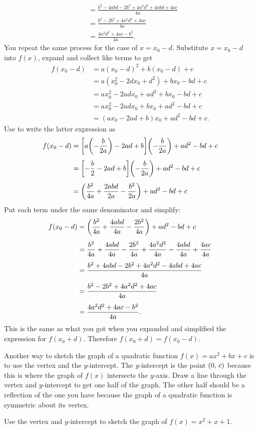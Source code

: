 \documentclass[a4paper,oneside,12pt]{article}
\begin{document}
\begin{problem}
{\begin{solution}
\begin{align*}
&=
\frac{
  b^2 - 4abd - 2b^2 + 4a^2d^2 + 4abd + 4ac
}{
  4a
} \\[4pt]
&=
\frac{
  b^2 - 2b^2 + 4a^2d^2 + 4ac
}{
  4a
} \\[4pt]
&=
\frac{
  4a^2d^2 + 4ac - b^2
}{
  4a
}.
\end{align*}
You repeat the same process for the case of $x = x_0 - d$.  Substitute
$x = x_0 - d$ into $f(x)$, expand and collect like terms to get
\begin{align*}
f(x_0 - d)
&=
a(x_0 - d)^2 + b(x_0 - d) + c \\[4pt]
&=
a(x_0^2 - 2dx_0 + d^2) + bx_0 - bd + c \\[4pt]
&=
ax_0^2 - 2adx_0 + ad^2 + bx_0 - bd + c \\[4pt]
&=
ax_0^2 - 2adx_0 + bx_0 + ad^2 - bd + c \\[4pt]
&=
(ax_0 - 2ad + b)x_0 + ad^2 - bd + c.
\end{align*}
Use  to write the
latter expression as
\begin{align*}
f(x_0 - d)
&=
\squarebracket*{
  a\parenthesis*{-\frac{b}{2a}} - 2ad + b
}
\parenthesis*{-\frac{b}{2a}} + ad^2 - bd + c \\[4pt]
&=
\squarebracket*{
  -\frac{b}{2} - 2ad + b
}
\parenthesis*{-\frac{b}{2a}} + ad^2 - bd + c \\[4pt]
&=
\parenthesis*{
  \frac{b^2}{4a} + \frac{2abd}{2a} - \frac{b^2}{2a}
}
+ ad^2 - bd + c
\end{align*}
Put each term under the same denominator and simplify:
\begin{align*}
f(x_0 - d)
&=
\parenthesis*{
  \frac{b^2}{4a} + \frac{4abd}{4a} - \frac{2b^2}{4a}
}
+ ad^2 - bd + c \\[4pt]
&=
\frac{b^2}{4a} + \frac{4abd}{4a} - \frac{2b^2}{4a}
+ \frac{4a^2d^2}{4a} - \frac{4abd}{4a} + \frac{4ac}{4a} \\[4pt]
&=
\frac{
  b^2 + 4abd - 2b^2 + 4a^2d^2 - 4abd + 4ac
}{
  4a
} \\[4pt]
&=
\frac{
  b^2 - 2b^2 + 4a^2d^2 + 4ac
}{
  4a
} \\[4pt]
&=
\frac{
  4a^2d^2 + 4ac - b^2
}{
  4a
}.
\end{align*}
This is the same as what you got when you expanded and simplified the
expression for $f(x_0 + d)$.  Therefore $f(x_0 + d) = f(x_0 - d)$.
\end{solution}
}{}

\item Another way to sketch the graph of a quadratic function
  $f(x) = ax^2 + bx + c$ is to use the vertex and the $y$-intercept.
  The $y$-intercept is the point $\tuple{0}{c}$ because this is where
  the graph of $f(x)$ intersects the $y$-axis.  Draw a line through
  the vertex and $y$-intercept to get one half of the graph.  The
  other half should be a reflection of the one you have because the
  graph of a quadratic function is symmetric about its vertex.
  \begin{packedenum}
  \item\label{subprob:graph_sketch_vertex_y_intercept}
    Use the vertex and $y$-intercept to sketch the graph of
    $f(x) = x^2 + x + 1$.


\end{packedenum}
\end{problem}
\end{document}
